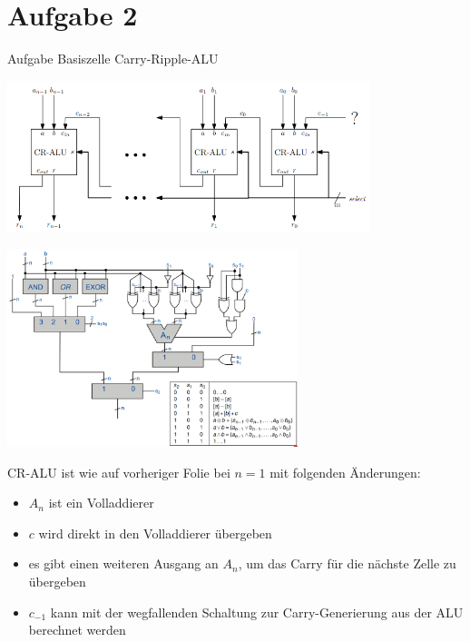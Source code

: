 
\section{Aufgabe 2}

\setcounter{exercise}{1}

\begin{frame}[allowframebreaks]{Aufgabe \thesection}{Basiszelle Carry-Ripple-ALU}

\begin{exercisenoinc}
    \center\includegraphics[width=300pt]{figures/CR-ALU.png}
\end{exercisenoinc}

\begin{requirementsnoinc}
    \center\includegraphics[width=240pt]{figures/ALU_logic.png}
\end{requirementsnoinc}

\begin{solutionnoinc}
CR-ALU ist wie auf vorheriger Folie bei $n=1$ mit folgenden Änderungen:
    \begin{itemize}
        \item $A_n$ ist ein Volladdierer
        \item $c$ wird direkt in den Volladdierer übergeben
        \item es gibt einen weiteren Ausgang an $A_n$, um das Carry für die nächste Zelle zu übergeben
        \item $c_{-1}$ kann mit der wegfallenden Schaltung zur Carry-Generierung aus der ALU berechnet werden
    \end{itemize}
\end{solutionnoinc}


\end{frame}

